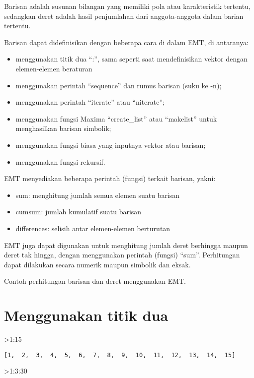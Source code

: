\documentclass[
]{book}
\begin{document}
Barisan adalah susunan bilangan yang memiliki pola atau karakteristik tertentu, sedangkan deret adalah hasil penjumlahan dari anggota-anggota dalam barian tertentu.

Barisan dapat didefinisikan dengan beberapa cara di dalam EMT, di antaranya:

\begin{itemize}
\item
  menggunakan titik dua ``:'', sama seperti saat mendefinisikan vektor dengan elemen-elemen beraturan
\item
  menggunakan perintah ``sequence'' dan rumus barisan (suku ke -n);
\item
  menggunakan perintah ``iterate'' atau ``niterate'';
\item
  menggunakan fungsi Maxima ``create\_list'' atau ``makelist'' untuk menghasilkan barisan simbolik;
\item
  menggunakan fungsi biasa yang inputnya vektor atau barisan;
\item
  menggunakan fungsi rekursif.
\end{itemize}

EMT menyediakan beberapa perintah (fungsi) terkait barisan, yakni:

\begin{itemize}
\item
  sum: menghitung jumlah semua elemen suatu barisan
\item
  cumsum: jumlah kumulatif suatu barisan
\item
  differences: selisih antar elemen-elemen berturutan
\end{itemize}

EMT juga dapat digunakan untuk menghitung jumlah deret berhingga maupun deret tak hingga, dengan menggunakan perintah (fungsi) ``sum''. Perhitungan dapat dilakukan secara numerik maupun simbolik dan eksak.

Contoh perhitungan barisan dan deret menggunakan EMT.

\section{Menggunakan titik dua}\label{menggunakan-titik-dua}

\textgreater1:15

\begin{verbatim}
[1,  2,  3,  4,  5,  6,  7,  8,  9,  10,  11,  12,  13,  14,  15]
\end{verbatim}

\textgreater1:3:30
\end{document}
